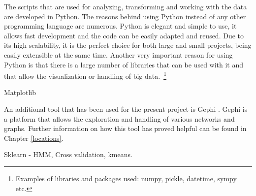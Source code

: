 The scripts that are used for analyzing, transforming and working with the data
are developed in Python. The reasons behind using Python instead of any other
programming language are numerous. Python is elegant and simple to use, it
allows fast development and the code can be easily adapted and reused. Due to
its high scalability, it is the perfect choice for both large and small
projects, being easily extensible at the same time. Another very important
reason for using Python is that there is a large number of libraries that can be
used with it and that allow the visualization or handling of big
data.~\footnote{Examples of libraries and packages used: numpy, pickle,
datetime, sympy etc.}

Matplotlib 

An additional tool that has been used for the present project is Gephi
\cite{Gephi}. Gephi is a platform that allows the exploration and handling of
various networks and graphs. Further information on how this tool has proved
helpful can be found in Chapter \ref{locations}.

Sklearn - HMM, Cross validation, kmeans.
